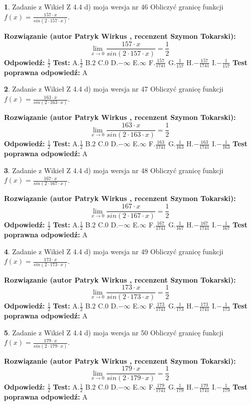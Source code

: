 \documentclass[12pt, a4paper]{article}
\theoremstyle{definition} %
\newtheorem{zad}{}
\newcommand{\zadStart}[1]{\begin{zad}#1\newline}
\newcommand{\zadStop}{\end{zad}}
\newcommand{\rozwStart}[2]{\noindent \textbf{Rozwiązanie (autor #1 , recenzent #2): }\newline}
\newcommand{\rozwStop}{\newline}
\newcommand{\odpStart}{\noindent \textbf{Odpowiedź:}\newline}
\newcommand{\odpStop}{\newline}
\newcommand{\testStart}{\noindent \textbf{Test:}\newline}
\newcommand{\testStop}{\newline}
\newcommand{\kluczStart}{\noindent \textbf{Test poprawna odpowiedź:}\newline}
\newcommand{\kluczStop}{\newline}
\begin{document}
\zadStart{Zadanie z Wikieł Z 4.4 d) moja wersja nr 46}
Obliczyć granicę funkcji $f(x)=\frac{157\cdot x}{sin(2 \cdot157\cdot x)}$.
\zadStop
\rozwStart{Patryk Wirkus}{Szymon Tokarski}
$$\lim\limits_{x\to 0}\frac{157\cdot x}{sin(2 \cdot157\cdot x)}=\frac{1}{2}$$
\rozwStop
\odpStart
$\frac{1}{2}$
\odpStop
\testStart
A.$\frac{1}{2}$
B.$2$
C.$0$
D.$-\infty$
E.$\infty$
F.$\frac{157}{1741}$
G.$\frac{1}{157}$
H.$-\frac{157}{1741}$
I.$-\frac{1}{157}$
\testStop
\kluczStart
A
\kluczStop



\zadStart{Zadanie z Wikieł Z 4.4 d) moja wersja nr 47}
Obliczyć granicę funkcji $f(x)=\frac{163\cdot x}{sin(2 \cdot163\cdot x)}$.
\zadStop
\rozwStart{Patryk Wirkus}{Szymon Tokarski}
$$\lim\limits_{x\to 0}\frac{163\cdot x}{sin(2 \cdot163\cdot x)}=\frac{1}{2}$$
\rozwStop
\odpStart
$\frac{1}{2}$
\odpStop
\testStart
A.$\frac{1}{2}$
B.$2$
C.$0$
D.$-\infty$
E.$\infty$
F.$\frac{163}{1741}$
G.$\frac{1}{163}$
H.$-\frac{163}{1741}$
I.$-\frac{1}{163}$
\testStop
\kluczStart
A
\kluczStop



\zadStart{Zadanie z Wikieł Z 4.4 d) moja wersja nr 48}
Obliczyć granicę funkcji $f(x)=\frac{167\cdot x}{sin(2 \cdot167\cdot x)}$.
\zadStop
\rozwStart{Patryk Wirkus}{Szymon Tokarski}
$$\lim\limits_{x\to 0}\frac{167\cdot x}{sin(2 \cdot167\cdot x)}=\frac{1}{2}$$
\rozwStop
\odpStart
$\frac{1}{2}$
\odpStop
\testStart
A.$\frac{1}{2}$
B.$2$
C.$0$
D.$-\infty$
E.$\infty$
F.$\frac{167}{1741}$
G.$\frac{1}{167}$
H.$-\frac{167}{1741}$
I.$-\frac{1}{167}$
\testStop
\kluczStart
A
\kluczStop



\zadStart{Zadanie z Wikieł Z 4.4 d) moja wersja nr 49}
Obliczyć granicę funkcji $f(x)=\frac{173\cdot x}{sin(2 \cdot173\cdot x)}$.
\zadStop
\rozwStart{Patryk Wirkus}{Szymon Tokarski}
$$\lim\limits_{x\to 0}\frac{173\cdot x}{sin(2 \cdot173\cdot x)}=\frac{1}{2}$$
\rozwStop
\odpStart
$\frac{1}{2}$
\odpStop
\testStart
A.$\frac{1}{2}$
B.$2$
C.$0$
D.$-\infty$
E.$\infty$
F.$\frac{173}{1741}$
G.$\frac{1}{173}$
H.$-\frac{173}{1741}$
I.$-\frac{1}{173}$
\testStop
\kluczStart
A
\kluczStop



\zadStart{Zadanie z Wikieł Z 4.4 d) moja wersja nr 50}
Obliczyć granicę funkcji $f(x)=\frac{179\cdot x}{sin(2 \cdot179\cdot x)}$.
\zadStop
\rozwStart{Patryk Wirkus}{Szymon Tokarski}
$$\lim\limits_{x\to 0}\frac{179\cdot x}{sin(2 \cdot179\cdot x)}=\frac{1}{2}$$
\rozwStop
\odpStart
$\frac{1}{2}$
\odpStop
\testStart
A.$\frac{1}{2}$
B.$2$
C.$0$
D.$-\infty$
E.$\infty$
F.$\frac{179}{1741}$
G.$\frac{1}{179}$
H.$-\frac{179}{1741}$
I.$-\frac{1}{179}$
\testStop
\kluczStart
A
\kluczStop
\end{document}
